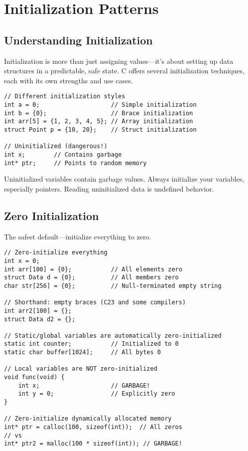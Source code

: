 \chapter{Initialization Patterns}

\section{Understanding Initialization}

Initialization is more than just assigning values---it's about setting up data structures in a predictable, safe state. C offers several initialization techniques, each with its own strengths and use cases.

\begin{lstlisting}
// Different initialization styles
int a = 0;                    // Simple initialization
int b = {0};                  // Brace initialization
int arr[5] = {1, 2, 3, 4, 5}; // Array initialization
struct Point p = {10, 20};    // Struct initialization

// Uninitialized (dangerous!)
int x;        // Contains garbage
int* ptr;     // Points to random memory
\end{lstlisting}

\begin{warningbox}
Uninitialized variables contain garbage values. Always initialize your variables, especially pointers. Reading uninitialized data is undefined behavior.
\end{warningbox}

\section{Zero Initialization}

The safest default---initialize everything to zero.

\begin{lstlisting}
// Zero-initialize everything
int x = 0;
int arr[100] = {0};           // All elements zero
struct Data d = {0};          // All members zero
char str[256] = {0};          // Null-terminated empty string

// Shorthand: empty braces (C23 and some compilers)
int arr2[100] = {};
struct Data d2 = {};

// Static/global variables are automatically zero-initialized
static int counter;           // Initialized to 0
static char buffer[1024];     // All bytes 0

// Local variables are NOT zero-initialized
void func(void) {
    int x;                    // GARBAGE!
    int y = 0;                // Explicitly zero
}

// Zero-initialize dynamically allocated memory
int* ptr = calloc(100, sizeof(int));  // All zeros
// vs
int* ptr2 = malloc(100 * sizeof(int)); // GARBAGE!
\end{lstlisting}

